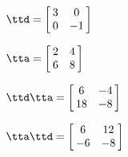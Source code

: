 {$\ttd = \left[\hskip -3pt \begin{array}{cc} 3&0\\  0&-1\end {array} \hskip -3pt
 \right]$
 
$\tta = \left[\hskip -3pt \begin{array}{cc} 2&4\\  6&8\end {array} \hskip -3pt
 \right] $}
{$\ttd\tta= \left[\hskip -3pt \begin{array}{cc} 6&-4\\  18&-8\end{array}\hskip -3pt \right] $

$\tta\ttd =  \left[\hskip -3pt \begin{array}{cc} 6&12\\  -6&-8\end{array}\hskip -3pt \right]$
}
 